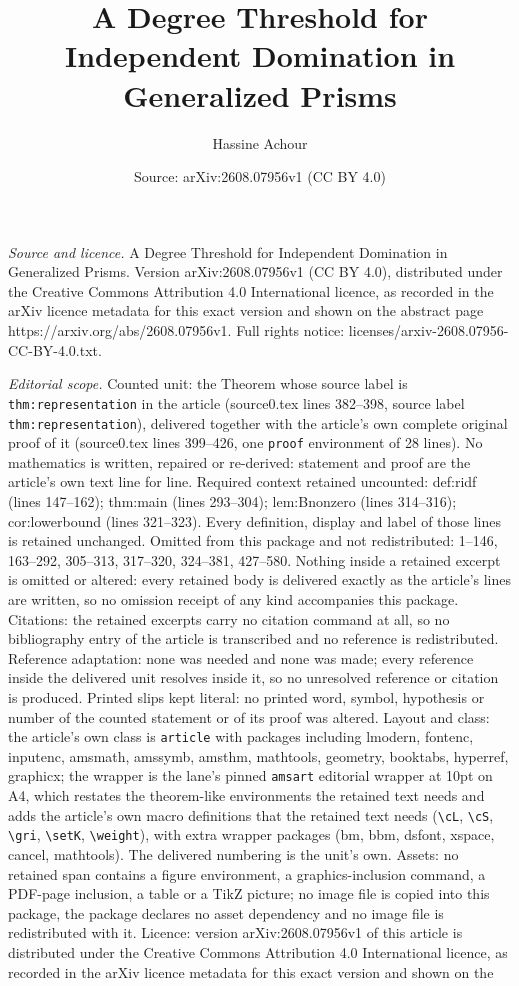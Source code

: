 \documentclass[10pt,a4paper]{amsart}
\title[A Degree Threshold for Independent Domination in Generalized]{A Degree Threshold for Independent Domination in Generalized Prisms}
\author{Hassine Achour}
\date{Source: arXiv:2608.07956v1 (CC BY 4.0)}
\begin{document}
\maketitle

\noindent\emph{Source and licence.} A Degree Threshold for Independent Domination in Generalized Prisms. Version arXiv:2608.07956v1 (CC BY 4.0), distributed under the Creative Commons Attribution 4.0 International licence, as recorded in the arXiv licence metadata for this exact version and shown on the abstract page https://arxiv.org/abs/2608.07956v1. Full rights notice: licenses/arxiv-2608.07956-CC-BY-4.0.txt.\par\smallskip

\noindent\textit{Editorial scope.} Counted unit: the Theorem whose source label is \texttt{thm:representation} in the article (source0.tex lines 382--398, source label \texttt{thm:representation}), delivered together with the article's own complete original proof of it (source0.tex lines 399--426, one \texttt{proof} environment of 28 lines). No mathematics is written, repaired or re-derived: statement and proof are the article's own text line for line. Required context retained uncounted: def:ridf (lines 147--162); thm:main (lines 293--304); lem:Bnonzero (lines 314--316); cor:lowerbound (lines 321--323). Every definition, display and label of those lines is retained unchanged. Omitted from this package and not redistributed: 1--146, 163--292, 305--313, 317--320, 324--381, 427--580. Nothing inside a retained excerpt is omitted or altered: every retained body is delivered exactly as the article's lines are written, so no omission receipt of any kind accompanies this package. Citations: the retained excerpts carry no citation command at all, so no bibliography entry of the article is transcribed and no reference is redistributed. Reference adaptation: none was needed and none was made; every reference inside the delivered unit resolves inside it, so no unresolved reference or citation is produced. Printed slips kept literal: no printed word, symbol, hypothesis or number of the counted statement or of its proof was altered. Layout and class: the article's own class is \texttt{article} with packages including lmodern, fontenc, inputenc, amsmath, amssymb, amsthm, mathtools, geometry, booktabs, hyperref, graphicx; the wrapper is the lane's pinned \texttt{amsart} editorial wrapper at 10pt on A4, which restates the theorem-like environments the retained text needs and adds the article's own macro definitions that the retained text needs (\texttt{\textbackslash cL}, \texttt{\textbackslash cS}, \texttt{\textbackslash gri}, \texttt{\textbackslash setK}, \texttt{\textbackslash weight}), with extra wrapper packages (bm, bbm, dsfont, xspace, cancel, mathtools). The delivered numbering is the unit's own. Assets: no retained span contains a figure environment, a graphics-inclusion command, a PDF-page inclusion, a table or a TikZ picture; no image file is copied into this package, the package declares no asset dependency and no image file is redistributed with it. Licence: version arXiv:2608.07956v1 of this article is distributed under the Creative Commons Attribution 4.0 International licence, as recorded in the arXiv licence metadata for this exact version and shown on the 
\end{document}
